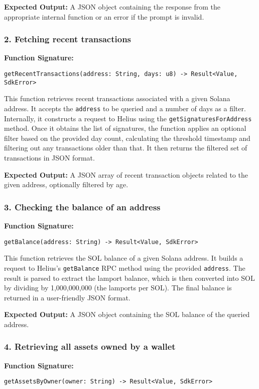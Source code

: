\documentclass[
]{article}
\begin{document}
\textbf{Expected Output:} A JSON object containing the response from the appropriate internal function or an error if the prompt is invalid.

\subsubsection{2. Fetching recent transactions}
\textbf{Function Signature:}
\begin{verbatim}
getRecentTransactions(address: String, days: u8) -> Result<Value, SdkError>
\end{verbatim}

This function retrieves recent transactions associated with a given Solana address. It accepts the \texttt{address} to be queried and a number of days as a filter. Internally, it constructs a request to Helius using the \texttt{getSignaturesForAddress} method. Once it obtains the list of signatures, the function applies an optional filter based on the provided day count, calculating the threshold timestamp and filtering out any transactions older than that. It then returns the filtered set of transactions in JSON format.

\textbf{Expected Output:} A JSON array of recent transaction objects related to the given address, optionally filtered by age.

\subsubsection{3. Checking the balance of an address}
\textbf{Function Signature:}
\begin{verbatim}
getBalance(address: String) -> Result<Value, SdkError>
\end{verbatim}

This function retrieves the SOL balance of a given Solana address. It builds a request to Helius's \texttt{getBalance} RPC method using the provided \texttt{address}. The result is parsed to extract the lamport balance, which is then converted into SOL by dividing by 1,000,000,000 (the lamports per SOL). The final balance is returned in a user-friendly JSON format.

\textbf{Expected Output:} A JSON object containing the SOL balance of the queried address.

\subsubsection{4. Retrieving all assets owned by a wallet}
\textbf{Function Signature:}
\begin{verbatim}
getAssetsByOwner(owner: String) -> Result<Value, SdkError>
\end{verbatim}
\end{document}
